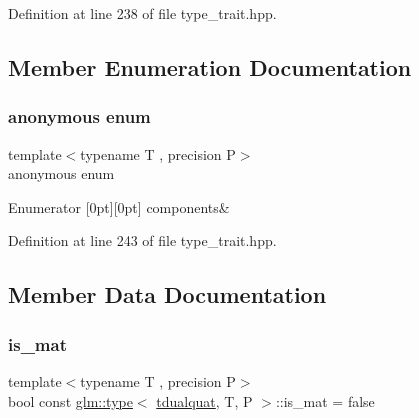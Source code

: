 Definition at line 238 of file type\+\_\+trait.\+hpp.



\subsection{Member Enumeration Documentation}
\mbox{\label{structglm_1_1type_3_01tdualquat_00_01_t_00_01_p_01_4_a9d8780911d2c669abeb74b149e477116}} 
\subsubsection{\texorpdfstring{anonymous enum}{anonymous enum}}
{\footnotesize\ttfamily template$<$typename T , precision P$>$ \\
anonymous enum}

\begin{DoxyEnumFields}{Enumerator}
[0pt][0pt]{}\mbox{\label{structglm_1_1type_3_01tdualquat_00_01_t_00_01_p_01_4_a9d8780911d2c669abeb74b149e477116a95326e874f0bb50afc5b3cc19d092cc1}} 
components&\\
\hline

\end{DoxyEnumFields}


Definition at line 243 of file type\+\_\+trait.\+hpp.



\subsection{Member Data Documentation}
\mbox{\label{structglm_1_1type_3_01tdualquat_00_01_t_00_01_p_01_4_a4ff76551c61e4695135ea1e346d3a49e}} 
\subsubsection{\texorpdfstring{is\_mat}{is\_mat}}
{\footnotesize\ttfamily template$<$typename T , precision P$>$ \\
bool const \mbox{\hyperlink{structglm_1_1type}{glm\+::type}}$<$ \mbox{\hyperlink{structglm_1_1tdualquat}{tdualquat}}, T, P $>$\+::is\+\_\+mat = false\hspace{0.3cm}{\ttfamily [static]}}



